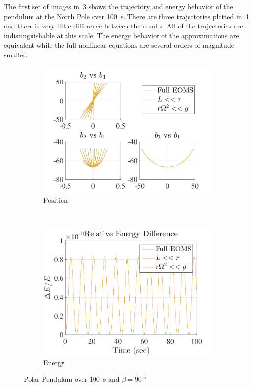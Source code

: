 \documentclass[11pt, reqno]{article}   	%
\begin{document}
The first set of images in~\cref{fig:pole_pendulum_short_2} shows the trajectory and energy behavior of the pendulum at the North Pole over \SI{100}{s}.
There are three trajectories plotted in~\cref{fig:pole_pos_short_2} and there is very little difference between the results.
All of the trajectories are indistinguishable at this scale.
The energy behavior of the approximations are equivalent while the full-nonlinear equations are several orders of magnitude smaller.
\begin{figure}[htbp] 
    \centering 
    \begin{subfigure}[htbp]{0.5\textwidth} 
        \includegraphics[width=\textwidth]{figures/pole_position_short_2.pdf} 
        \caption{Position } \label{fig:pole_pos_short_2}
    \end{subfigure}~ %
    \begin{subfigure}[htbp]{0.5\textwidth} 
        \includegraphics[width=\textwidth]{figures/pole_energy_short_2.pdf} 
        \caption{Energy } \label{fig:pole_energy_short_2} 
    \end{subfigure}
    \caption{Polar Pendulum over \SI{100}{s} and \( \beta = \SI{90}{\degree} \)}
    \label{fig:pole_pendulum_short_2} 
\end{figure}
\end{document}
